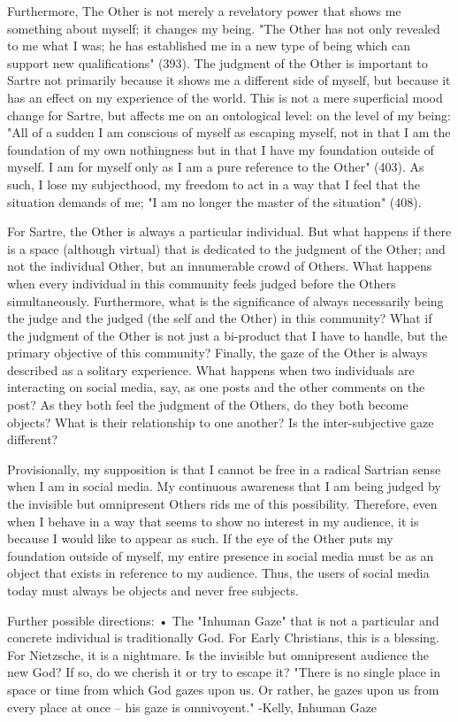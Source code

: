 Furthermore, The Other is not merely a revelatory power that shows me something about myself; it changes my being. "The Other has not only revealed to me what I was; he has established me in a new type of being which can support new qualifications" (393). The judgment of the Other is important to Sartre not primarily because it shows me a different side of myself, but because it has an effect on my experience of the world. This is not a mere superficial mood change for Sartre, but affects me on an ontological level: on the level of my being: "All of a sudden I am conscious of myself as escaping myself, not in that I am the foundation of my own nothingness but in that I have my foundation outside of myself. I am for myself only as I am a pure reference to the Other" (403). As such, I lose my subjecthood, my freedom to act in a way that I feel that the situation demands of me; "I am no longer the master of the situation" (408).
 
For Sartre, the Other is always a particular individual. But what happens if there is a space (although virtual) that is dedicated to the judgment of the Other; and not the individual Other, but an innumerable crowd of Others. What happens when every individual in this community feels judged before the Others simultaneously. Furthermore, what is the significance of always necessarily being the judge and the judged (the self and the Other) in this community? What if the judgment of the Other is not just a bi-product that I have to handle, but the primary objective of this community? Finally, the gaze of the Other is always described as a solitary experience. What happens when two individuals are interacting on social media, say, as one posts and the other comments on the post? As they both feel the judgment of the Others, do they both become objects? What is their relationship to one another? Is the inter-subjective gaze different?
 
Provisionally, my supposition is that I cannot be free in a radical Sartrian sense when I am in social media. My continuous awareness that I am being judged by the invisible but omnipresent Others rids me of this possibility. Therefore, even when I behave in a way that seems to show no interest in my audience, it is because I would like to appear as such. If the eye of the Other puts my foundation outside of myself, my entire presence in social media must be as an object that exists in reference to my audience. Thus, the users of social media today must always be objects and never free subjects.
 
Further possible directions:
•	The "Inhuman Gaze" that is not a particular and concrete individual is traditionally God. For Early Christians, this is a blessing. For Nietzsche, it is a nightmare. Is the invisible but omnipresent audience the new God? If so, do we cherish it or try to escape it? "There is no single place in space or time from which God gazes upon us. Or rather, he gazes upon us from every place at once – his gaze is omnivoyent." -Kelly, Inhuman Gaze

